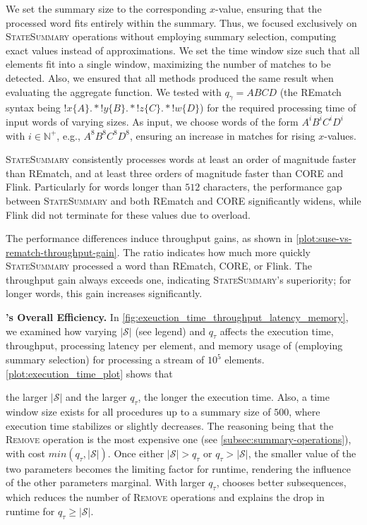 {{We set the summary size to the corresponding $x$-value, ensuring that the
processed word fits entirely within the summary. Thus, we focused
exclusively on \textsc{StateSummary} operations without employing summary
selection, computing exact values instead of approximations. We set the time
window size such that all elements fit into a single window, maximizing the
number of matches to be detected. Also, we ensured that all methods produced
the same result when evaluating the aggregate function.} We tested with
$q_\gamma = ABCD$ (the REmatch syntax being
$!x\{A\}.*!y\{B\}.*!z\{C\}.*!w\{D\}$) for the required processing time of
input words of varying sizes. As input, we choose words of the form
$A^iB^iC^iD^i$ with $i \in \mathbb{N}^+$, e.g., $A^8B^8C^8D^8$, ensuring an increase in matches for rising $x$-values.}

{\textsc{StateSummary} consistently processes words at least an order of magnitude faster than REmatch, and at least three orders of magnitude faster than CORE and Flink. Particularly for words longer than $512$ characters, the performance gap between \textsc{StateSummary} and both REmatch and CORE significantly widens, while Flink did not terminate for these values due to overload.}


The performance differences induce throughput gains, as shown in
\autoref{plot:suse-vs-rematch-throughput-gain}. The ratio indicates how much
more quickly \textsc{StateSummary} processed a word than REmatch, CORE, or Flink. The throughput gain always exceeds one, indicating \textsc{StateSummary}'s superiority; for longer words, this gain increases significantly.


\textbf{\suse{}'s Overall Efficiency.} In
\autoref{fig:exeuction_time_throughput_latency_memory}, we examined how varying
$|\mathcal{S}|$ (see legend) and $q_\tau$ affects the execution time,
throughput, processing latency per element, and memory usage of \suse{} (employing summary selection) for processing a stream of $10^5$ elements.
 \autoref{plot:execution_time_plot} shows that

 the larger $|\mathcal{S}|$ and the larger $q_\tau$, the longer the execution
 time.
Also, a time window size exists for all
 procedures up to a summary size of $500$, where execution time stabilizes
 or slightly decreases. The reasoning being that the \textsc{Remove}
 operation is the most
 expensive one (see \autoref{subsec:summary-operations}), with cost
 $min(q_\tau,
 |\mathcal{S}|)$. Once either $|\mathcal{S}| > q_\tau$ or $q_\tau >
 |\mathcal{S}|$, the smaller value of the two parameters becomes the limiting
 factor for runtime, rendering the influence of the other parameters
 marginal. %
 With larger $q_\tau$, \suse{} chooses better subsequences, which reduces
 the number of \textsc{Remove} operations and explains the drop in
 runtime for $q_\tau \geq |\mathcal{S}|$.

